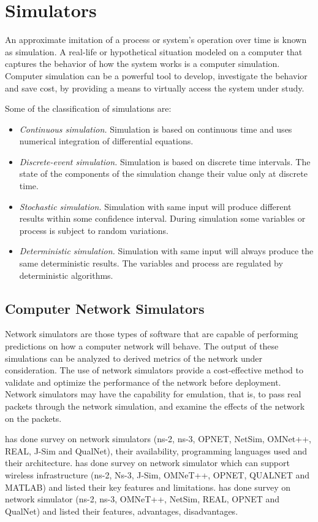 \section{Simulators}

An approximate imitation of a process or system's operation over time is known as simulation. A real-life or hypothetical situation modeled on a computer that captures the behavior of how the system works is a computer simulation. Computer simulation can be a powerful tool to develop, investigate the behavior and save cost, by providing a means to virtually access the system under study.

Some of the classification of simulations are:
\begin{itemize}
	\item \textit{Continuous simulation.} Simulation is based on continuous time and uses numerical integration of differential equations.
	\item \textit{Discrete-event simulation.} Simulation is based on discrete time intervals. The state of the components of the simulation change their value only at discrete time. 
	\item \textit{Stochastic simulation.} Simulation with same input will produce different results within some confidence interval. During simulation some variables or process is subject to random variations.
	\item \textit{Deterministic simulation.} Simulation with same input will always produce the same deterministic results. The variables and process are regulated by deterministic algorithms.
\end{itemize}

\subsection{Computer Network Simulators}

Network simulators are those types of software that are capable of performing predictions on how a computer network will behave. The output of these simulations can be analyzed to derived metrics of the network under consideration. The use of network simulators provide a cost-effective method to validate and optimize the performance of the network before deployment. Network simulators may have the capability for emulation, that is, to pass real packets through the network simulation, and examine the effects of the network on the packets. 

 has done survey on network simulators (ns-2, ns-3, OPNET, NetSim, OMNet++, REAL, J-Sim and QualNet), their availability, programming languages used and their architecture.   has done survey on network simulator which can support wireless infrastructure (ns-2, Ns-3, J-Sim, OMNeT++, OPNET, QUALNET and MATLAB) and listed their key features and limitations.  has done survey on network simulator (ns-2, ns-3, OMNeT++, NetSim, REAL, OPNET and QualNet) and listed their features, advantages, disadvantages.

